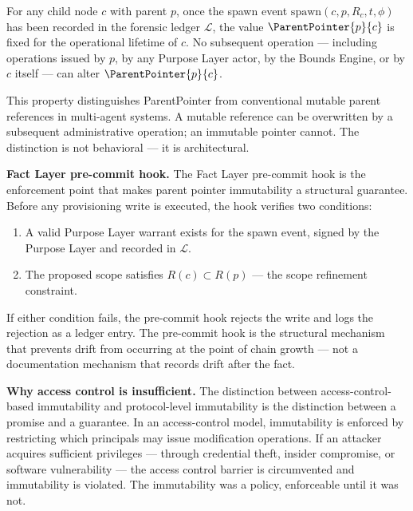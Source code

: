 \begin{prop}
\label{prop:parent-pointer-immutable}
For any child node $c$ with parent $p$, once the spawn event $\mathrm{spawn}(c, p, R_c, t, \phi)$ has been recorded in the forensic ledger $\mathcal{L}$, the value $\ParentPointer{p}{c}$ is fixed for the operational lifetime of $c$. No subsequent operation --- including operations issued by $p$, by any Purpose Layer actor, by the Bounds Engine, or by $c$ itself --- can alter $\ParentPointer{p}{c}$.
\end{prop}

This property distinguishes ParentPointer from conventional mutable parent references in multi-agent systems. A mutable reference can be overwritten by a subsequent administrative operation; an immutable pointer cannot. The distinction is not behavioral --- it is architectural.

\medskip
\noindent\textbf{Fact Layer pre-commit hook.} The Fact Layer pre-commit hook is the enforcement point that makes parent pointer immutability a structural guarantee. Before any provisioning write is executed, the hook verifies two conditions:

\begin{enumerate}
    \item[(FC1)] A valid Purpose Layer warrant exists for the spawn event, signed by the Purpose Layer and recorded in $\mathcal{L}$.
    \item[(FC2)] The proposed scope satisfies $R(c) \subset R(p)$ --- the scope refinement constraint.
\end{enumerate}

If either condition fails, the pre-commit hook rejects the write and logs the rejection as a ledger entry. The pre-commit hook is the structural mechanism that prevents drift from occurring at the point of chain growth --- not a documentation mechanism that records drift after the fact.

\medskip
\noindent\textbf{Why access control is insufficient.} The distinction between access-control-based immutability and protocol-level immutability is the distinction between a promise and a guarantee. In an access-control model, immutability is enforced by restricting which principals may issue modification operations. If an attacker acquires sufficient privileges --- through credential theft, insider compromise, or software vulnerability --- the access control barrier is circumvented and immutability is violated. The immutability was a policy, enforceable until it was not.

